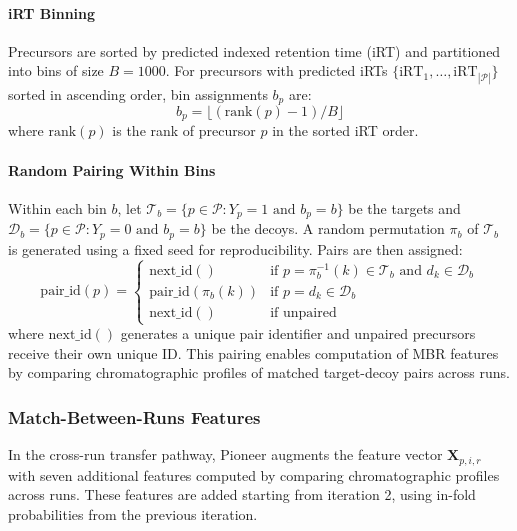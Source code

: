 \documentclass[pdflatex,sn-nature]{sn-jnl}
\begin{document}
\paragraph{iRT Binning}\label{para:irt-binning} Precursors are sorted by predicted indexed retention time (iRT) and partitioned into bins of size $B = 1000$. For precursors with predicted iRTs $\{\text{iRT}_1, \ldots, \text{iRT}_{|\mathcal{P}|}\}$ sorted in ascending order, bin assignments $b_p$ are:
\begin{equation}
  b_p = \lfloor (\text{rank}(p) - 1) / B \rfloor
\end{equation}
where $\text{rank}(p)$ is the rank of precursor $p$ in the sorted iRT order.

\paragraph{Random Pairing Within Bins}\label{para:random-pairing-within-bins} Within each bin $b$, let $\mathcal{T}_b = \{p \in \mathcal{P} : Y_p = 1 \text{ and } b_p = b\}$ be the targets and $\mathcal{D}_b = \{p \in \mathcal{P} : Y_p = 0 \text{ and } b_p = b\}$ be the decoys. A random permutation $\pi_b$ of $\mathcal{T}_b$ is generated using a fixed seed for reproducibility. Pairs are then assigned:
\begin{equation}
  \text{pair\_id}(p) = \begin{cases}
      \text{next\_id}() & \text{if } p = \pi_b^{-1}(k) \in \mathcal{T}_b \text{ and } d_k \in \mathcal{D}_b \\
      \text{pair\_id}(\pi_b(k)) & \text{if } p = d_k \in \mathcal{D}_b \\
      \text{next\_id}() & \text{if unpaired}
  \end{cases}
\end{equation}
where $\text{next\_id}()$ generates a unique pair identifier and unpaired precursors receive their own unique ID. This pairing enables computation of MBR features by comparing chromatographic profiles of matched target-decoy pairs across runs.

\subsubsection{Match-Between-Runs Features}\label{sec:mbr_features}

In the cross-run transfer pathway, Pioneer augments the feature vector $\mathbf{X}_{p,i,r}$ with seven additional features computed by comparing chromatographic profiles across runs. These features are added starting from iteration 2, using in-fold probabilities from the previous iteration.
\end{document}
